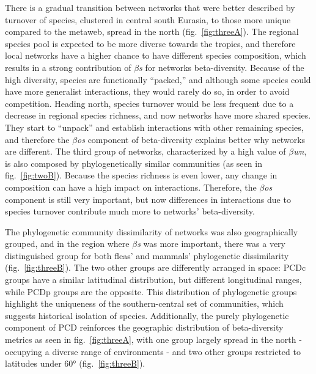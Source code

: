 \documentclass[11pt]{article}
\begin{document}
There is a gradual transition between networks that were better
described by turnover of species, clustered in central south Eurasia, to
those more unique compared to the metaweb, spread in the north
(fig.~\ref{fig:threeA}). The regional species pool is expected to be
more diverse towards the tropics, and therefore local networks have a
higher chance to have different species composition, which results in a
strong contribution of \emph{\(\beta\)s} for networks beta-diversity.
Because of the high diversity, species are functionally ``packed,'' and
although some species could have more generalist interactions, they
would rarely do so, in order to avoid competition. Heading north,
species turnover would be less frequent due to a decrease in regional
species richness, and now networks have more shared species. They start
to ``unpack'' and establish interactions with other remaining species,
and therefore the \emph{\(\beta\)os} component of beta-diversity
explains better why networks are different. The third group of networks,
characterized by a high value of \emph{\(\beta\)wn}, is also composed by
phylogenetically similar communities (as seen in fig.~\ref{fig:twoB}).
Because the species richness is even lower, any change in composition
can have a high impact on interactions. Therefore, the
\emph{\(\beta\)os} component is still very important, but now
differences in interactions due to species turnover contribute much more
to networks' beta-diversity.

The phylogenetic community dissimilarity of networks was also
geographically grouped, and in the region where \emph{\(\beta\)s} was
more important, there was a very distinguished group for both fleas' and
mammals' phylogenetic dissimilarity (fig.~\ref{fig:threeB}). The two
other groups are differently arranged in space: PCDc groups have a
similar latitudinal distribution, but different longitudinal ranges,
while PCDp groups are the opposite. This distribution of phylogenetic
groups highlight the uniqueness of the southern-central set of
communities, which suggests historical isolation of species.
Additionally, the purely phylogenetic component of PCD reinforces the
geographic distribution of beta-diversity metrics as seen in
fig.~\ref{fig:threeA}, with one group largely spread in the north -
occupying a diverse range of environments - and two other groups
restricted to latitudes under 60° (fig.~\ref{fig:threeB}).
\end{document}
